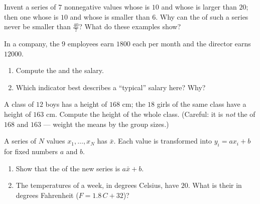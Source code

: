 \begin{exercise}[$\star\star$]\label{exo:g10:stats:6}
Invent a series of $7$ nonnegative values whose  is $10$ and whose
 is larger than $20$; then one whose  is $10$ and whose  is
smaller than $6$. Why can the  of such a series never be smaller than
$\frac{40}{7}$? What do these examples show?
\end{exercise}

\begin{exercise}[$\star\star$]\label{exo:g10:stats:7}
In a company, the $9$ employees earn $1800$ each per month and the
director earns $12000$.
\begin{enumerate}
  \item Compute the  and the  salary.
  \item Which indicator best describes a ``typical'' salary here? Why?
\end{enumerate}
\end{exercise}

\begin{exercise}[$\star\star$]\label{exo:g10:stats:8}
A class of $12$ boys has a  height of $168$ cm; the $18$ girls of the
same class have a  height of $163$ cm. Compute the  height of the
whole class. (Careful: it is \emph{not} the  of $168$ and $163$
--- weight the means by the group sizes.)
\end{exercise}

\begin{exercise}[$\star\star\star$]\label{exo:g10:stats:9}
A series of $N$ values $x_1, \dots, x_N$ has  $\bar x$. Each value is
transformed into $y_i = a x_i + b$ for fixed numbers $a$ and $b$.
\begin{enumerate}
  \item Show that the  of the new series is $a \bar x + b$.
  \item The temperatures of a week, in degrees Celsius, have  $20$.
        What is their  in degrees Fahrenheit
        ($F = 1.8\,C + 32$)?
\end{enumerate}
\end{exercise}

